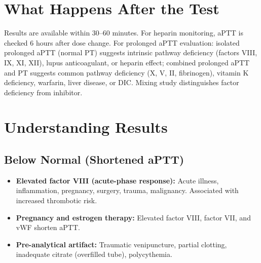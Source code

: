\section*{What Happens After the Test}
Results are available within 30--60 minutes. For heparin monitoring, aPTT is checked 6 hours after dose change. For prolonged aPTT evaluation: isolated prolonged aPTT (normal PT) suggests intrinsic pathway deficiency (factors VIII, IX, XI, XII), lupus anticoagulant, or heparin effect; combined prolonged aPTT and PT suggests common pathway deficiency (X, V, II, fibrinogen), vitamin K deficiency, warfarin, liver disease, or DIC. Mixing study distinguishes factor deficiency from inhibitor.

\section*{Understanding Results}

\subsection*{Below Normal (Shortened aPTT)}
\begin{itemize}
  \item \textbf{Elevated factor VIII (acute-phase response):} Acute illness, inflammation, pregnancy, surgery, trauma, malignancy. Associated with increased thrombotic risk.
  \item \textbf{Pregnancy and estrogen therapy:} Elevated factor VIII, factor VII, and vWF shorten aPTT.
  \item \textbf{Pre-analytical artifact:} Traumatic venipuncture, partial clotting, inadequate citrate (overfilled tube), polycythemia.
\end{itemize}

